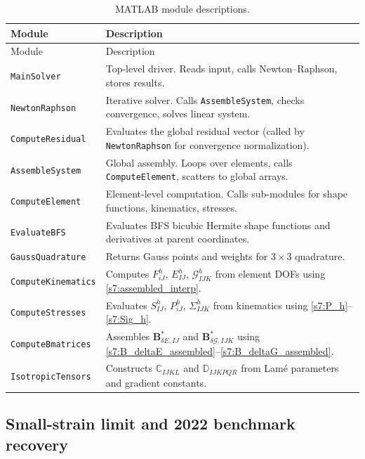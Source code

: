 \documentclass[11pt]{article}
\begin{document}
\begin{longtable}[c]{>{\raggedright\arraybackslash}p{0.25\linewidth}
>{\raggedright\arraybackslash}p{0.75\linewidth}}
\caption{MATLAB module descriptions.}
\label{tab:modules}\\
\toprule
Module & Description \\
\midrule
\endfirsthead
\toprule
Module & Description \\
\midrule
\endhead
\texttt{MainSolver} & Top-level driver. Reads input, calls Newton--Raphson, stores results. \\
\texttt{NewtonRaphson} & Iterative solver. Calls \texttt{AssembleSystem}, checks convergence, solves linear system. \\
\texttt{ComputeResidual} & Evaluates the global residual vector (called by \texttt{NewtonRaphson} for convergence normalization). \\
\texttt{AssembleSystem} & Global assembly. Loops over elements, calls \texttt{ComputeElement}, scatters to global arrays. \\
\texttt{ComputeElement} & Element-level computation. Calls sub-modules for shape functions, kinematics, stresses. \\
\texttt{EvaluateBFS} & Evaluates BFS bicubic Hermite shape functions and derivatives at parent coordinates. \\
\texttt{GaussQuadrature} & Returns Gauss points and weights for $3\times 3$ quadrature. \\
\texttt{ComputeKinematics} & Computes $F_{iJ}^{h}$, $E_{IJ}^{h}$, $\mathcal{G}_{IJK}^{h}$ from element DOFs using \eqref{s7:assembled_interp}. \\
\texttt{ComputeStresses} & Evaluates $S_{IJ}^{h}$, $P_{iJ}^{h}$, $\Sigma_{IJK}^{h}$ from kinematics using \eqref{s7:P_h}--\eqref{s7:Sig_h}. \\
\texttt{ComputeBmatrices} & Assembles $\mathbf{B}_{\delta E,IJ}^{*}$ and $\mathbf{B}_{\delta\mathcal{G},IJK}^{*}$ using \eqref{s7:B_deltaE_assembled}--\eqref{s7:B_deltaG_assembled}. \\
\texttt{IsotropicTensors} & Constructs $\mathbb{C}_{IJKL}$ and $\mathbb{D}_{IJKPQR}$ from Lam\'e parameters and gradient constants. \\
\bottomrule
\end{longtable}

\subsection{Small-strain limit and 2022 benchmark recovery}
\label{ssec:recovery}
\end{document}
